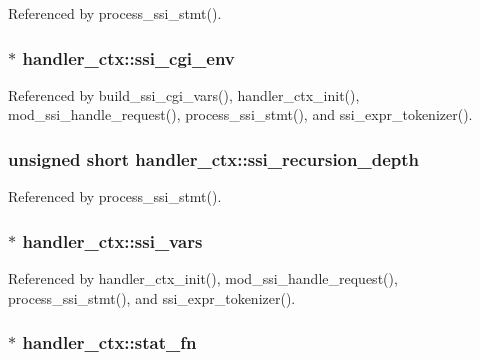 Referenced by process\-\_\-ssi\-\_\-stmt().

\hypertarget{structhandler__ctx_a2ccb015ec36c9f4b33f232c5572d7cfd}{
\subsubsection[{ssi\-\_\-cgi\-\_\-env}]{$\ast$ handler\-\_\-ctx\-::ssi\-\_\-cgi\-\_\-env}}\label{structhandler__ctx_a2ccb015ec36c9f4b33f232c5572d7cfd}


Referenced by build\-\_\-ssi\-\_\-cgi\-\_\-vars(), handler\-\_\-ctx\-\_\-init(), mod\-\_\-ssi\-\_\-handle\-\_\-request(), process\-\_\-ssi\-\_\-stmt(), and ssi\-\_\-expr\-\_\-tokenizer().

\hypertarget{structhandler__ctx_af075fb2ccd8e1c33cca00440ed2155e5}{
\subsubsection[{ssi\-\_\-recursion\-\_\-depth}]{\setlength{\rightskip}{0pt plus 5cm}unsigned short handler\-\_\-ctx\-::ssi\-\_\-recursion\-\_\-depth}}\label{structhandler__ctx_af075fb2ccd8e1c33cca00440ed2155e5}


Referenced by process\-\_\-ssi\-\_\-stmt().

\hypertarget{structhandler__ctx_a28b63088e2d58e4b41b65ef38e390eed}{
\subsubsection[{ssi\-\_\-vars}]{$\ast$ handler\-\_\-ctx\-::ssi\-\_\-vars}}\label{structhandler__ctx_a28b63088e2d58e4b41b65ef38e390eed}


Referenced by handler\-\_\-ctx\-\_\-init(), mod\-\_\-ssi\-\_\-handle\-\_\-request(), process\-\_\-ssi\-\_\-stmt(), and ssi\-\_\-expr\-\_\-tokenizer().

\hypertarget{structhandler__ctx_a8ae46226d68013df9892f006c1c3c8c9}{
\subsubsection[{stat\-\_\-fn}]{$\ast$ handler\-\_\-ctx\-::stat\-\_\-fn}}\label{structhandler__ctx_a8ae46226d68013df9892f006c1c3c8c9}


